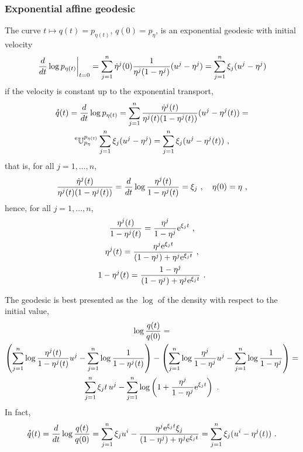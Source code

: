 \documentclass[12pt,a4paper]{amsart}
\theoremstyle{remark}
\begin{document}
\subsubsection{Exponential affine geodesic}
\label{sec:expon-affine-geod}
The curve $t \mapsto q(t) = p_{\eta(t)}$, $q(0) = p_{\eta}$, is an exponential geodesic with initial velocity
\begin{equation}
  \label{eq:50}
\left. \frac{d}{dt} \log p_{\eta(t)} \right|_{t=0} = \sum_{j=1}^n \dot \eta^j(0) \frac{1}{\eta^j(1 - \eta^j)} (u^j - \eta^j) = \sum_{j=1}^n \xi_j (u^j - \eta^j)
\end{equation}
if the velocity is constant up to the exponential transport,
\begin{multline}
  \label{eq:15a}
\accentset{\star}{q}(t) = \frac{d}{dt} \log p_{\eta(t)} =  \sum_{j=1}^n \frac{\dot \eta^j(t)}{\eta^j(t)(1 - \eta^j(t))} (u^j - \eta^j(t)) = \\ \prescript{\text{e}}{} {\mathbb U} _ {p_\eta} ^ {p_{\eta(t)}} \sum_{j=1}^n \xi_j (u^j - \eta^j) = \sum_{j=1}^n \xi_j (u^j - \eta^j(t)) \ ,  
\end{multline}
that is, for all $j = 1,\dots,n$,
\begin{equation}
  \label{eq:16a}
  \frac {\dot \eta^j(t)} {\eta^j(t)(1-\eta^j(t))} = \derivby t \log \frac {\eta^j(t)} {1-\eta^j(t)} = \xi_j \ , \quad  \eta(0) = \eta \ ,
\end{equation}
hence, for all $j=1,\dots, n$,
\begin{gather}
  \label{eq:35}
  \frac{\eta^j(t)}{1-\eta^j(t)} = \frac{\eta^j}{1-\eta^j}\mathrm{e}^{\xi_j t} \ , \\
  \label{eq:33}
\eta^j(t) = \frac{\eta^j\mathrm{e}^{\xi_jt}} {(1-\eta^j) + \eta^j\mathrm{e}^{\xi_jt}} \ , \\  
  \label{eq:34}
  1 - \eta^j(t) = \frac{1 - \eta^j} {(1-\eta^j) + \eta^j\mathrm{e}^{\xi_jt}} \ .
\end{gather}

The geodesic is best presented as the $\log$ of the density with respect to the initial value,
\begin{multline}
  \label{eq:36}
  \log\frac{q(t)}{q(0)} = \\
  \left(\sum_{j=1}^n \log \frac {\eta^j(t)}{1 - \eta^j(t)} u^j - \sum_{j=1}^n \log \frac 1 {1 - \eta^j(t)}\right) - \left(\sum_{j=1}^n \log \frac {\eta^j}{1-\eta^j} u^j- \sum_{j=1}^n \log \frac 1 {1 - \eta^j} \right) = \\ \sum_{j=1}^n \xi_jt\, u^j - \sum_{j=1}^n \log\left(1 + \frac{\eta^j}{1-\eta^j}\mathrm{e}^{\xi_jt}\right) \ .
\end{multline}
In fact,
\begin{equation}
  \label{eq:37}
  \velocity q(t) = \derivby t \log \frac{q(t)}{q(0)} = \sum_{j=1}^n \xi_j u^i - \frac{\eta^j \euler^{\xi_j t} \xi_j}{(1-\eta^j)+\eta^j \euler^{\xi_j t}} = \sum_{j=1}^n \xi_j (u^i - \eta^j(t)) \ .
\end{equation}
\end{document}
